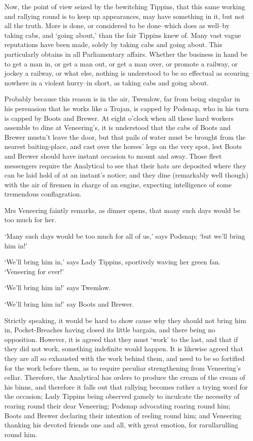 Now, the point of view seized by the bewitching Tippins, that this same
working and rallying round is to keep up appearances, may have something
in it, but not all the truth. More is done, or considered to be
done--which does as well--by taking cabs, and ‘going about,’ than the
fair Tippins knew of. Many vast vague reputations have been made,
solely by taking cabs and going about. This particularly obtains in all
Parliamentary affairs. Whether the business in hand be to get a man in,
or get a man out, or get a man over, or promote a railway, or jockey
a railway, or what else, nothing is understood to be so effectual as
scouring nowhere in a violent hurry--in short, as taking cabs and going
about.

Probably because this reason is in the air, Twemlow, far from being
singular in his persuasion that he works like a Trojan, is capped by
Podsnap, who in his turn is capped by Boots and Brewer. At eight o’clock
when all these hard workers assemble to dine at Veneering’s, it is
understood that the cabs of Boots and Brewer mustn’t leave the door, but
that pails of water must be brought from the nearest baiting-place,
and cast over the horses’ legs on the very spot, lest Boots and Brewer
should have instant occasion to mount and away. Those fleet messengers
require the Analytical to see that their hats are deposited where they
can be laid hold of at an instant’s notice; and they dine (remarkably
well though) with the air of firemen in charge of an engine, expecting
intelligence of some tremendous conflagration.

Mrs Veneering faintly remarks, as dinner opens, that many such days
would be too much for her.

‘Many such days would be too much for all of us,’ says Podsnap; ‘but
we’ll bring him in!’

‘We’ll bring him in,’ says Lady Tippins, sportively waving her green
fan. ‘Veneering for ever!’

‘We’ll bring him in!’ says Twemlow.

‘We’ll bring him in!’ say Boots and Brewer.

Strictly speaking, it would be hard to show cause why they should not
bring him in, Pocket-Breaches having closed its little bargain, and
there being no opposition. However, it is agreed that they must ‘work’
to the last, and that if they did not work, something indefinite would
happen. It is likewise agreed that they are all so exhausted with the
work behind them, and need to be so fortified for the work before them,
as to require peculiar strengthening from Veneering’s cellar. Therefore,
the Analytical has orders to produce the cream of the cream of his
binns, and therefore it falls out that rallying becomes rather a trying
word for the occasion; Lady Tippins being observed gamely to inculcate
the necessity of rearing round their dear Veneering; Podsnap advocating
roaring round him; Boots and Brewer declaring their intention of reeling
round him; and Veneering thanking his devoted friends one and all, with
great emotion, for rarullarulling round him.

